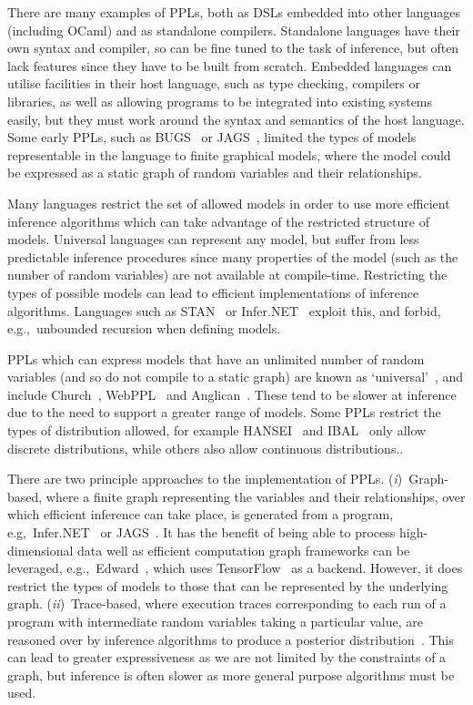 \documentclass[sigconf]{acmart}
\newcommand{\one}{({\em i})\/}
\newcommand{\two}{({\em ii})\/}
\begin{document}
There are many examples of PPLs, both as DSLs embedded into other languages (including OCaml) and as standalone compilers. Standalone languages have their own syntax and compiler, so can be fine tuned to the task of inference, but often lack features since they have to be built from scratch. Embedded languages can utilise facilities in their host language, such as type checking, compilers or libraries, as well as allowing programs to be integrated into existing systems easily, but they must work around the syntax and semantics of the host language. Some early PPLs, such as BUGS~\cite{gilks1994bugs} or JAGS~\cite{plummer2004jags}, limited the types of models representable in the language to finite graphical models, where the model could be expressed as a static graph of random variables and their relationships.

Many languages restrict the set of allowed models in order to use more efficient inference algorithms which can take advantage of the restricted structure of models. Universal languages can represent any model, but suffer from less predictable inference procedures since many properties of the model (such as the number of random variables) are not available at compile-time. Restricting the types of possible models can lead to efficient implementations of inference algorithms. Languages such as STAN~\cite{carpenter2017stan} or Infer.NET~\cite{wang2011using} exploit this, and forbid, e.g.,~unbounded recursion when defining models.

PPLs which can express models that have an unlimited number of random variables (and so do not compile to a static graph) are known as `universal'~\cite{borgstrom2016lambda}, and include Church~\cite{goodman2012church}, WebPPL~\cite{mobus2018structure} and Anglican~\cite{anglican-smc}. These tend to be slower at inference due to the need to support a greater range of models. Some PPLs restrict the types of distribution allowed, for example HANSEI~\cite{kiselyov2009embedded} and IBAL~\cite{ibal} only allow discrete distributions, while others also allow continuous distributions..

There are two principle approaches to the implementation of PPLs. \one~Graph-based, where a finite graph representing the variables and their relationships, over which efficient inference can take place, is generated from a program, e.g,~Infer.NET~\cite{wang2011using} or JAGS~\cite{plummer2004jags}. It has the benefit of being able to process high-dimensional data well as efficient computation graph frameworks can be leveraged, e.g.,~Edward~\cite{edward}, which uses TensorFlow~\cite{tensorflow} as a backend. However, it does restrict the types of models to those that can be represented by the underlying graph. \two~Trace-based, where execution traces corresponding to each run of a program with intermediate random variables taking a particular value, are reasoned over by inference algorithms to produce a posterior distribution~\cite{anglican-smc,mobus2018structure}. This can lead to greater expressiveness as we are not limited by the constraints of a graph, but inference is often slower as more general purpose algorithms must be used.
\end{document}
